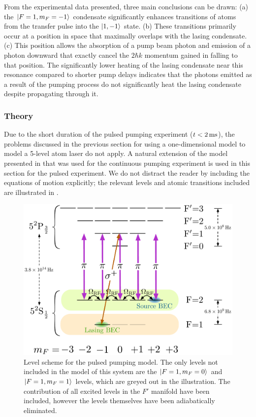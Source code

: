 From the experimental data presented, three main conclusions can be drawn: (a) the ${\left|F=1, m_F=-1\right>}$ condensate significantly enhances transitions of atoms from the transfer pulse into the ${\left|1, -1\right>}$ state. (b) These transitions primarily occur at a position in space that maximally overlaps with the lasing condensate. (c) This position allows the absorption of a pump beam photon and emission of a photon downward that exactly cancel the $2 \hbar k$ momentum gained in falling to that position.  The significantly lower heating of the lasing condensate near this resonance compared to shorter pump delays indicates that the photons emitted as a result of the pumping process do not significantly heat the lasing condensate despite propagating through it.

\subsubsection{Theory}

Due to the short duration of the pulsed pumping experiment ($t < \unit[2]{ms}$), the problems discussed in the previous section for using a one-dimensional model to model a 5-level atom laser do not apply.  A natural extension of the model presented in  that was used for the continuous pumping experiment is used in this section for the pulsed experiment.  We do not distract the reader by including the equations of motion explicitly; the relevant levels and atomic transitions included are illustrated in .

\begin{figure}
    \centering
    \includegraphics[width=12cm]{PulsedPumpingLevelDiagram}
    \caption{Level scheme for the pulsed pumping model.  The only levels not included in the model of this system are the ${\left|F=1, m_F=0\right>}$ and ${\left|F=1, m_F=1\right>}$ levels, which are greyed out in the illustration.  The contribution of all excited levels in the $F'$ manifold have been included, however the levels themselves have been adiabatically eliminated.}
    \label{OpticalPumping:PulsedPumpingLevelDiagram}
\end{figure}

